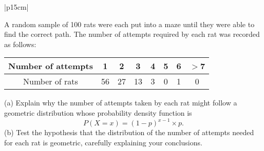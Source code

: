 \documentclass[a4paper,12pt]{article}
\begin{document}
	\begin{table}[ht!]
		
		\centering
		
		\begin{tabular}{|p{15cm}|}
			
			\hline  
			
			\large
			\noindent A random sample of 100 rats were each put into a maze until they were able to find the correct path.  The number of attempts required by each rat was recorded as follows:
			\begin{center}
				\begin{tabular}{|c|c|c|c|c|c|c|c|}\hline
					Number of attempts &  1& 2& 3 &4 &5 &6 & $>$7\\\hline
					Number of rats& 56& 27& 13& 3 &0 &1& 0\\\hline
				\end{tabular}
			\end{center}
			(a) Explain why the number of attempts taken by each rat might follow a geometric distribution whose probability density function is \[P (X=x) = (1- p)^{x-1} \times p.\]
			(b) Test the hypothesis that the distribution of the number of attempts needed for each rat is geometric, carefully explaining your conclusions.
			
			
			\\ \hline
			
		\end{tabular}
		
	\end{table}
	
\end{document}
